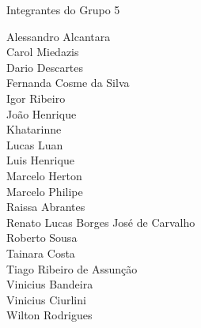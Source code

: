 \begin{folhadeaprovacao}

  \begin{center}
    {\ABNTEXchapterfont\large\imprimirautor}

    \vspace*{\fill}\vspace*{\fill}
    {\ABNTEXchapterfont\bfseries\Large\imprimirtitulo}
    \vspace*{\fill}

    Integrantes do Grupo 5

   \end{center}
   Alessandro Alcantara\\
   Carol Miedazis\\
   Dario Descartes\\
   Fernanda Cosme da Silva\\
   Igor Ribeiro\\
   João Henrique\\
   Khatarinne\\
   Lucas Luan\\
   Luis Henrique\\
   Marcelo Herton\\
   Marcelo Philipe\\
   Raissa Abrantes\\
   Renato Lucas Borges José de Carvalho\\
   Roberto Sousa\\
   Tainara Costa\\
   Tiago Ribeiro de Assunção\\
   Vinicius Bandeira\\
   Vinicius Ciurlini\\
   Wilton Rodrigues\\

\end{folhadeaprovacao}
